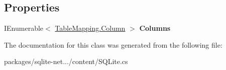 \subsection*{Properties}
\begin{DoxyCompactItemize}
\item 
\hypertarget{classSQLite_1_1NotNullConstraintViolationException_a3e68db16a1e55ac623c17205ad9e30dc}{I\-Enumerable$<$ \hyperlink{classSQLite_1_1TableMapping_1_1Column}{Table\-Mapping.\-Column} $>$ {\bfseries Columns}}\label{classSQLite_1_1NotNullConstraintViolationException_a3e68db16a1e55ac623c17205ad9e30dc}

\end{DoxyCompactItemize}


The documentation for this class was generated from the following file\-:\begin{DoxyCompactItemize}
\item 
packages/sqlite-\/net.../content/S\-Q\-Lite.\-cs\end{DoxyCompactItemize}
